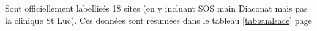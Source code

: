 \documentclass[12pt,english,french,twoside]{book}\usepackage[]{graphicx}\usepackage[]{color}
\providecommand{\tabularnewline}{\\} %
\begin{document}
Sont officiellement labellisés 18 sites (en y incluant SOS main Diaconat mais pas la clinique St Luc). Ces données sont résumées dans le tableau \ref{tab:sualsace} page \pageref{tab:sualsace}


% 
\end{document}
